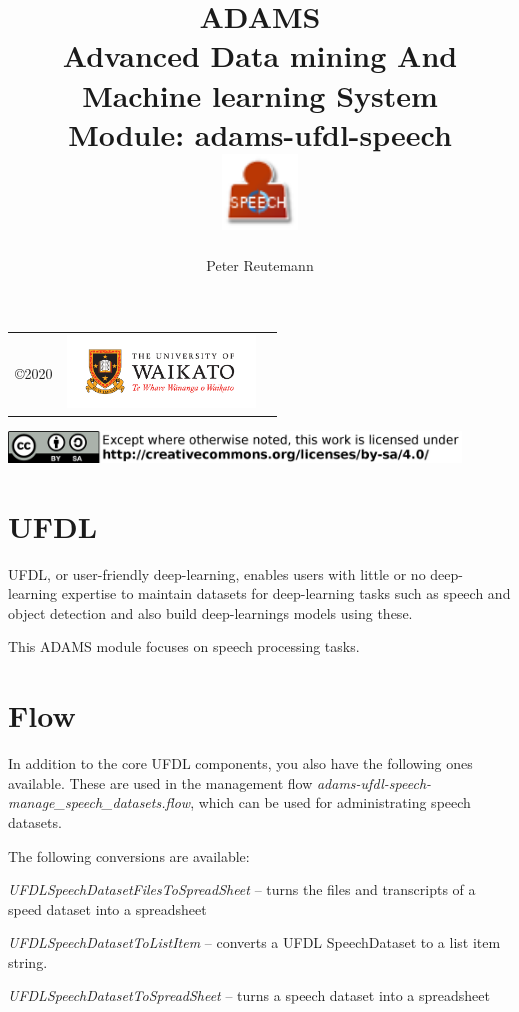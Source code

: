 \documentclass[a4paper]{book}
\title{
  \textbf{ADAMS} \\
  {\Large \textbf{A}dvanced \textbf{D}ata mining \textbf{A}nd \textbf{M}achine
  learning \textbf{S}ystem} \\
  {\Large Module: adams-ufdl-speech} \\
  \vspace{1cm}
  \includegraphics[width=2cm]{images/ufdl-speech-module.png} \\
}
\author{
  Peter Reutemann
}
\begin{document}
\begin{titlepage}
\maketitle

\thispagestyle{empty}
\center
\begin{table}[b]
	\begin{tabular}{c l l}
		\parbox[c][2cm]{2cm}{\copyright 2020} &
		\parbox[c][2cm]{5cm}{\includegraphics[width=5cm]{images/coat_of_arms.pdf}} \\
	\end{tabular}
	\includegraphics[width=12cm]{images/cc.png} \\
\end{table}

\end{titlepage}

\tableofcontents

\chapter{UFDL}
UFDL, or user-friendly deep-learning, enables users with little or no deep-learning
expertise to maintain datasets for deep-learning tasks such as speech
and object detection and also build deep-learnings models using these.

This ADAMS module focuses on speech processing tasks.

\chapter{Flow}

In addition to the core UFDL components, you also have the following ones available.
These are used in the management flow \textit{adams-ufdl-speech-manage\_speech\_datasets.flow},
which can be used for administrating speech datasets.

The following conversions are available:
\begin{tight_itemize}
  \item \textit{UFDLSpeechDatasetFilesToSpreadSheet} -- turns the files and transcripts of a speed dataset into a spreadsheet
  \item \textit{UFDLSpeechDatasetToListItem} -- converts a UFDL SpeechDataset to a list item string.
  \item \textit{UFDLSpeechDatasetToSpreadSheet} -- turns a speech dataset into a spreadsheet
\end{tight_itemize}
\end{document}
